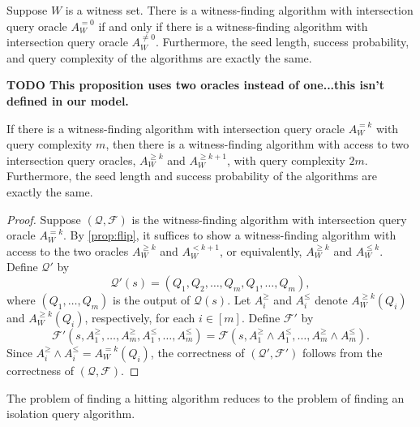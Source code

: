 \documentclass{article}
\newcommand{\todo}[1]{\textbf{TODO #1}}
\newcommand{\mc}{\mathcal}
\begin{document}
\begin{corollary}\label{cor:flip}
  Suppose $W$ is a witness set.
  There is a witness-finding algorithm with intersection query oracle $A^{= 0}_W$ if and only if there is a witness-finding algorithm with intersection query oracle $A^{\neq 0}_W$.
  Furthermore, the seed length, success probability, and query complexity of the algorithms are exactly the same.
\end{corollary}

\todo{This proposition uses two oracles instead of one...this isn't defined in our model.}

\begin{proposition}
  If there is a witness-finding algorithm with intersection query oracle $A^{=k}_W$ with query complexity $m$, then there is a witness-finding algorithm with access to two intersection query oracles, $A^{\geq k}_W$ and $A^{\geq k + 1}_W$,  with query complexity $2m$.
  Furthermore, the seed length and success probability of the algorithms are exactly the same.
\end{proposition}
\begin{proof}
  Suppose $(\mc{Q}, \mc{F})$ is the witness-finding algorithm with intersection query oracle $A^{=k}_W$.
  By \autoref{prop:flip}, it suffices to show a witness-finding algorithm with access to the two oracles $A^{\geq k}_W$ and $A^{< k + 1}_W$, or equivalently, $A^{\geq k}_W$ and $A^{\leq k}_W$.
  Define $\mc{Q}'$ by
  \begin{equation*}
    \mc{Q}'(s) = (Q_1, Q_2, \dotsc, Q_m, Q_1, \dotsc, Q_m),
  \end{equation*}
  where $(Q_1, \dotsc, Q_m)$ is the output of $\mc{Q}(s)$.
  Let $A^\geq_i$ and $A^\leq_i$ denote $A^{\geq k}_W(Q_i)$ and $A^{\geq k}_W(Q_i)$, respectively, for each $i \in [m]$.
  Define $\mc{F}'$ by
  \begin{equation*}
    \mc{F}'(s, A^\geq_1, \dotsc, A^\geq_m, A^\leq_1, \dotsc, A^\leq_m) = \mc{F}(s, A^\geq_1 \land A^\leq_1, \dotsc, A^\geq_m \land A^\leq_m).
  \end{equation*}
  Since $A^\geq_i \land A^\leq_i = A^{= k}_W(Q_i)$, the correctness of $(\mc{Q}', \mc{F}')$ follows from the correctness of $(\mc{Q}, \mc{F})$.
\end{proof}

The problem of finding a hitting algorithm reduces to the problem of finding an isolation query algorithm.
\end{document}
